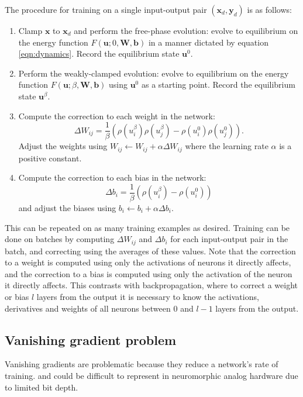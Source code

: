 \documentclass[utf8]{frontiersSCNS}
\newcommand{\mtx}[1]{\bm{#1}}
\begin{document}
The procedure for training on a single input-output pair $(\mtx{x}_d,\mtx{y}_d)$ is as follows:
\begin{enumerate}
\item Clamp $\mtx{x}$ to $\mtx{x}_d$ and perform the free-phase evolution: evolve to equilibrium on the energy function $F(\mtx{u}; 0, \mtx{W}, \mtx{b})$ in a manner dictated by equation \ref{eqn:dynamics}. Record the equilibrium state $\mtx{u}^0$.
\item Perform the weakly-clamped evolution: evolve to equilibrium on the energy function $F(\mtx{u}; \beta, \mtx{W}, \mtx{b})$ using $\mtx{u}^0$ as a starting point. Record the equilibrium state $\mtx{u}^{\beta}$.
\item Compute the correction to each weight in the network: 
\begin{equation}
\Delta W_{ij}=\frac{1}{\beta}(\rho(u_i^\beta)\rho(u_j^\beta)-\rho(u_i^0)\rho(u_j^0)). \label{eqn:weight_correction}
\end{equation}
Adjust the weights using $W_{ij}\leftarrow W_{ij}+\alpha\Delta W_{ij}$ where the learning rate $\alpha$ is a positive constant.
\item Compute the correction to each bias in the network:
\begin{equation}
\Delta b_i=\frac{1}{\beta}(\rho(u_i^{\beta})-\rho(u_i^0)) \label{eqn:bias_correction}
\end{equation}
and adjust the biases using $b_i\leftarrow b_i+\alpha\Delta b_i$.
\end{enumerate}
This can be repeated on as many training examples as desired. Training can be done on batches by computing $\Delta W_{ij}$ and $\Delta b_i$ for each input-output pair in the batch, and correcting using the averages of these values. Note that the correction to a weight is computed using only the activations of neurons it directly affects, and the correction to a bias is computed using only the activation of the neuron it directly affects. This contrasts with backpropagation, where to correct a weight or bias $l$ layers from the output it is necessary to know the activations, derivatives and weights of all neurons between $0$ and $l-1$ layers from the output.

\subsection{Vanishing gradient problem}
\label{sec:vangrad}

Vanishing gradients are problematic because they reduce a network's rate of training. and could be difficult to represent in neuromorphic analog hardware due to limited bit depth.
\end{document}
